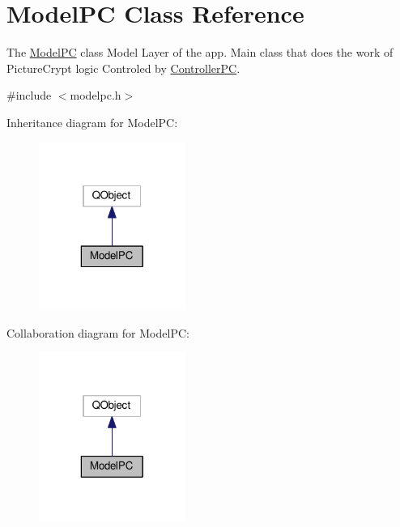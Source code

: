 \hypertarget{class_model_p_c}{\section{Model\-P\-C Class Reference}
\label{class_model_p_c}
}


The \hyperlink{class_model_p_c}{Model\-P\-C} class Model Layer of the app. Main class that does the work of Picture\-Crypt logic Controled by \hyperlink{class_controller_p_c}{Controller\-P\-C}.  




{\ttfamily \#include $<$modelpc.\-h$>$}



Inheritance diagram for Model\-P\-C\-:
\nopagebreak
\begin{figure}[H]
\begin{center}
\leavevmode
\includegraphics[width=136pt]{class_model_p_c__inherit__graph}
\end{center}
\end{figure}


Collaboration diagram for Model\-P\-C\-:
\nopagebreak
\begin{figure}[H]
\begin{center}
\leavevmode
\includegraphics[width=136pt]{class_model_p_c__coll__graph}
\end{center}
\end{figure}
